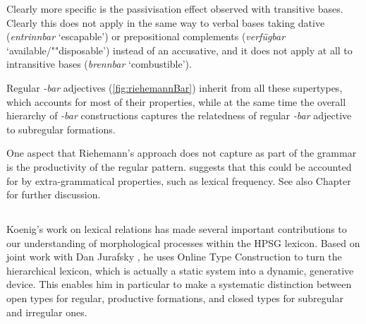 \documentclass[output=paper
 	        ,biblatex
                ,babelshorthands
                ,newtxmath
                ,draftmode
                ,colorlinks, citecolor=brown
]{langscibook}
\begin{document}
\begin{exe}

  \ex \label{ex:possibility}
\end{exe}

Clearly more specific is the passivisation effect observed with
transitive bases. Clearly this does not apply in the same way to
verbal bases taking dative (\textit{entrinnbar} `escapable') or
prepositional complements (\textit{verfügbar} `available/""disposable')
instead of an accusative, and it does not apply at all to intransitive
bases (\textit{brennbar} `combustible').  

\begin{exe}
  \ex
\end{exe}

Regular \textit{-bar} adjectives (\ref{fig:riehemannBar}) inherit from all these supertypes, which
accounts for most of their properties, while at the same time the overall hierarchy of \textit{-bar} constructions
captures the relatedness of regular \textit{-bar} adjective to subregular formations. 


One aspect that Riehemann's approach does not capture as part of the
grammar is the productivity of the regular
pattern.
 \citet[]{Riehemann98} suggests that this could be accounted for
by extra-grammatical properties, such as lexical frequency. See also
Chapter~ for further discussion.

\subsection{\texorpdfstring{\citet{Koenig99}}{Koenig (1999)}}

Koenig's work on lexical relations has made several important
contributions to our understanding of morphological processes within
the HPSG lexicon. Based on joint work with Dan Jurafsky
\citep{Koenig94}, he uses Online Type Construction to turn the
hierarchical lexicon, which is actually a static system into a
dynamic, generative device. This enables him in particular to make a
systematic distinction between open types for regular, productive
formations, and closed types for subregular and irregular ones.
\end{document}
